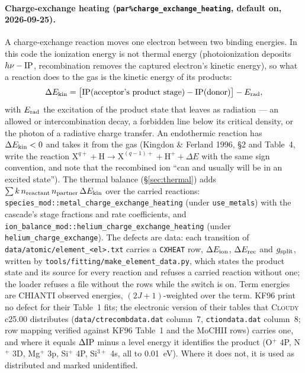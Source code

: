 \documentclass[english,a4paper]{my_memo}
\newcommand{\code}[1]{\texttt{#1}}
\begin{document}
\paragraph{Charge-exchange heating (\code{par\%charge\_exchange\_heating},
default on, 2026-09-25).}
A charge-exchange reaction moves one electron between two binding
energies.  In this code the ionization energy is not thermal energy
(photoionization deposits $h\nu - {\rm IP}$, recombination removes the
captured electron's kinetic energy), so what a reaction does to the gas is
the kinetic energy of its products:
\begin{equation}
  \Delta E_{\rm kin} = \big[{\rm IP}(\text{acceptor's product stage})
    - {\rm IP}(\text{donor})\big] - E_{\rm rad},
  \label{eq:cxheat}
\end{equation}
with $E_{\rm rad}$ the excitation of the product state that leaves as
radiation --- an allowed or intercombination decay, a forbidden line below
its critical density, or the photon of a radiative charge transfer.  An
endothermic reaction has $\Delta E_{\rm kin} < 0$ and takes it from the gas
(Kingdon \& Ferland 1996, \S2 and Table~4, write the reaction
$\mathrm{X}^{q+} + \mathrm{H} \to \mathrm{X}^{(q-1)+} + \mathrm{H}^+ +
\Delta E$ with the same sign convention, and note that the recombined ion
``can and usually will be in an excited state'').  The thermal balance
(\S\ref{sec:thermal}) adds $\sum k\,n_{\rm reactant}\,n_{\rm partner}\,
\Delta E_{\rm kin}$ over the carried reactions:
\code{species\_mod::metal\_charge\_exchange\_heating} (under
\code{use\_metals}) with the cascade's stage fractions and rate
coefficients, and \code{ion\_balance\_mod::helium\_charge\_exchange\_heating}
(under \code{helium\_charge\_exchange}).  The defects are data: each
transition of \code{data/atomic/element\_<el>.txt} carries a \code{CXHEAT}
row, $\Delta E_{\rm ion}$, $\Delta E_{\rm rec}$ and $g_{\rm split}$, written
by \code{tools/fitting/make\_element\_data.py}, which states the product
state and its source for every reaction and refuses a carried reaction
without one; the loader refuses a file without the rows while the switch is
on.  Term energies are CHIANTI observed energies, $(2J+1)$-weighted over the
term.  KF96 print no defect for their Table~1 fits; the electronic version
of their tables that \textsc{Cloudy} c25.00 distributes
(\code{data/ctrecombdata.dat} column~7, \code{ctiondata.dat} column~8;
row mapping verified against KF96 Table~1 and the MoCHII rows) carries one,
and where it equals $\Delta{\rm IP}$ minus a level energy it identifies the
product (O$^+$ 4P, N$^+$ 3D, Mg$^+$ 3p, Si$^+$ 4P, Si$^{3+}$ 4s, all to
0.01~eV).  Where it does not, it is used as distributed and marked
unidentified.
\end{document}
